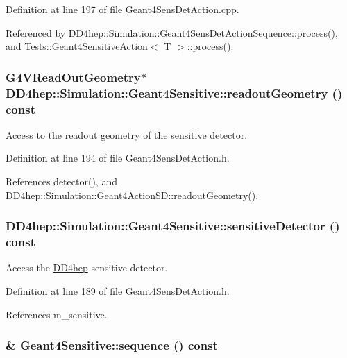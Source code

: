 Definition at line 197 of file Geant4SensDetAction.cpp.

Referenced by DD4hep::Simulation::Geant4SensDetActionSequence::process(), and Tests::Geant4SensitiveAction$<$ T $>$::process().\hypertarget{class_d_d4hep_1_1_simulation_1_1_geant4_sensitive_a86be000830d41ed4aa72b0dad36875b2}{
\subsubsection[{readoutGeometry}]{\setlength{\rightskip}{0pt plus 5cm}G4VReadOutGeometry$\ast$ DD4hep::Simulation::Geant4Sensitive::readoutGeometry () const}}
\label{class_d_d4hep_1_1_simulation_1_1_geant4_sensitive_a86be000830d41ed4aa72b0dad36875b2}


Access to the readout geometry of the sensitive detector. 

Definition at line 194 of file Geant4SensDetAction.h.

References detector(), and DD4hep::Simulation::Geant4ActionSD::readoutGeometry().\hypertarget{class_d_d4hep_1_1_simulation_1_1_geant4_sensitive_a116a18b8967f8606b94779ece95d615d}{
\subsubsection[{sensitiveDetector}]{ DD4hep::Simulation::Geant4Sensitive::sensitiveDetector () const}}
\label{class_d_d4hep_1_1_simulation_1_1_geant4_sensitive_a116a18b8967f8606b94779ece95d615d}


Access the \hyperlink{namespace_d_d4hep}{DD4hep} sensitive detector. 

Definition at line 189 of file Geant4SensDetAction.h.

References m\_\-sensitive.\hypertarget{class_d_d4hep_1_1_simulation_1_1_geant4_sensitive_a26950a2a0d717423dfef6d3bfe520677}{
\subsubsection[{sequence}]{ \& Geant4Sensitive::sequence () const}}
\label{class_d_d4hep_1_1_simulation_1_1_geant4_sensitive_a26950a2a0d717423dfef6d3bfe520677}


